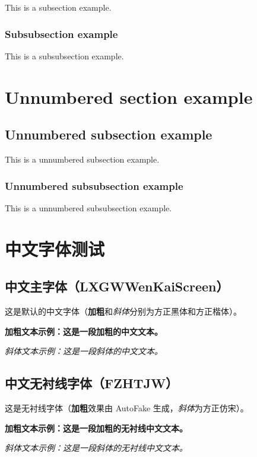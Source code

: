 \documentclass[fontset=none]{ctexart}
\begin{document}
This is a subsection example.

\subsubsection{Subsubsection example}

This is a subsubsection example.

\section*{Unnumbered section example}

\subsection*{Unnumbered subsection example}

This is a unnumbered subsection example.

\subsubsection*{Unnumbered subsubsection example}

This is a unnumbered subsubsection example.

\section{中文字体测试}

\subsection{中文主字体（LXGWWenKaiScreen）}
这是默认的中文字体（\textbf{加粗}和\textit{斜体}分别为方正黑体和方正楷体）。  
\par
\textbf{加粗文本示例：这是一段加粗的中文文本。}
\par
\textit{斜体文本示例：这是一段斜体的中文文本。}

\subsection{中文无衬线字体（FZHTJW）}
{\sffamily
这是无衬线字体（\textbf{加粗}效果由 AutoFake 生成，\textit{斜体}为方正仿宋）。  
\par
\textbf{加粗文本示例：这是一段加粗的无衬线中文文本。}
\par
\textit{斜体文本示例：这是一段斜体的无衬线中文文本。}
}
\end{document}
